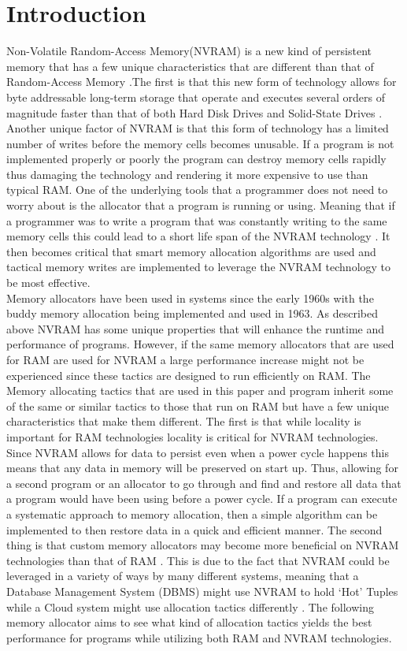 \documentclass[conference]{IEEEtran}
\begin{document}
\section{Introduction}
Non-Volatile Random-Access Memory(NVRAM)  is a new kind of persistent memory that has a few unique characteristics that are different than that of Random-Access Memory .The first is that this new form of technology allows for byte addressable long-term storage that operate and executes several orders of magnitude faster than that of both Hard Disk Drives  and Solid-State Drives \cite{Arulrajdbms}. Another unique factor of NVRAM is that this form of technology has a limited number of writes before the memory cells becomes unusable. If a program is not implemented properly or poorly the program can destroy memory cells rapidly thus damaging the technology and rendering it more expensive to use than typical RAM. One of the underlying tools that a programmer does not need to worry about is the allocator that a program is running or using.  Meaning that if a programmer was to write a program that was constantly writing to the same memory cells this could lead to a short life span of the NVRAM technology \cite{FullSysCrash}. It then becomes critical that smart memory allocation algorithms are used and tactical memory writes are implemented to leverage the NVRAM technology to be most effective. 
\\
Memory allocators have been used in systems since the early 1960s with the buddy memory allocation being implemented and used in 1963. As described above NVRAM has some unique properties that will enhance the runtime and performance of programs. However, if the same memory allocators that are used for RAM are used for NVRAM a large performance increase might not be experienced since these tactics are designed to run efficiently on RAM. The Memory allocating tactics that are used in this paper and program inherit some of the same or similar tactics to those that run on RAM but have a few unique characteristics that make them different. The first is that while locality is important for RAM technologies locality is critical for NVRAM technologies. Since NVRAM allows for data to persist even when a power cycle happens this means that any data in memory will be preserved on start up. Thus, allowing for a second program or an allocator to go through and find and restore all data that a program would have been using before a power cycle.  If a program can execute a systematic approach to memory allocation, then a simple algorithm can be implemented to then restore data in a quick and efficient manner. The second thing is that custom memory allocators may become more beneficial on NVRAM technologies than that of RAM \cite{berger-oopsla-2002}. This is due to the fact that NVRAM could be leveraged in a variety of ways by many different systems, meaning that a Database Management System (DBMS) might use NVRAM to hold ‘Hot’ Tuples while a Cloud system might use allocation tactics differently \cite{Arulrajdbms}.  The following memory allocator aims to see what kind of allocation tactics yields the best performance for programs while utilizing both RAM and NVRAM technologies. 
\end{document}
